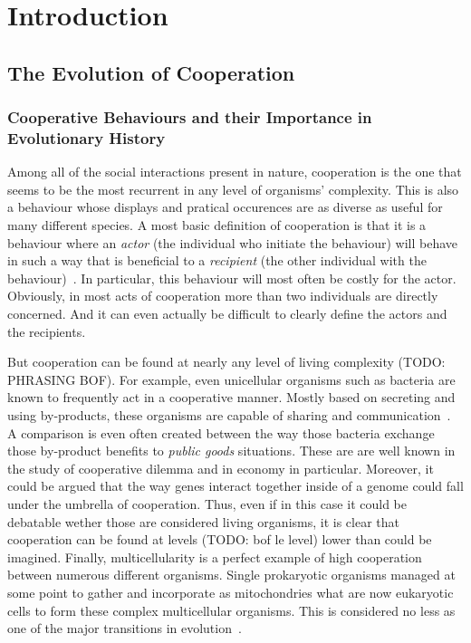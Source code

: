 \chapter{Introduction}

\minitoc[n] %

\section{The Evolution of Cooperation}

  \subsection{Cooperative Behaviours and their Importance in Evolutionary History}

    Among all of the social interactions present in nature, cooperation is the one that seems to be the most recurrent in any level of organisms' complexity. This is also a behaviour whose displays and pratical occurences are as diverse as useful for many different species. A most basic definition of cooperation is that it is a behaviour where an \emph{actor} (the individual who initiate the behaviour) will behave in such a way that is beneficial to a \emph{recipient} (the other individual with the behaviour)~\parencite{West2007a}. In particular, this behaviour will most often be costly for the actor. Obviously, in most acts of cooperation more than two individuals are directly concerned. And it can even actually be difficult to clearly define the actors and the recipients.

    But cooperation can be found at nearly any level of living complexity (TODO: PHRASING BOF). For example, even unicellular organisms such as bacteria are known to frequently act in a cooperative manner. Mostly based on secreting and using by-products, these organisms are capable of sharing and communication~\parencite{West2007b}. A comparison is even often created between the way those bacteria exchange those by-product benefits to \emph{public goods} situations. These are are well known in the study of cooperative dilemma and in economy in particular. Moreover, it could be argued that the way genes interact together inside of a genome could fall under the umbrella of cooperation. Thus, even if in this case it could be debatable wether those are considered living organisms, it is clear that cooperation can be found at levels (TODO: bof le level) lower than could be imagined. Finally, multicellularity is a perfect example of high cooperation between numerous different organisms. Single prokaryotic organisms managed at some point to gather and incorporate as mitochondries what are now eukaryotic cells to form these complex multicellular organisms. This is considered no less as one of the major transitions in evolution~\parencite{Szathmary1995}.

